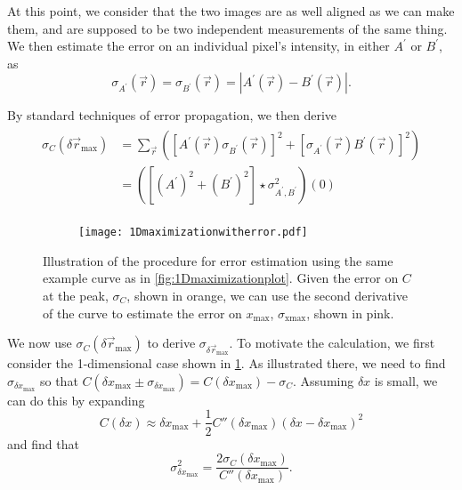 \documentclass{article}
\begin{document}
At this point, we consider that the two images are as well aligned as we can make them, and are supposed to be two independent measurements of the same thing.  We then estimate the error on an individual pixel's intensity, in either $A^\prime$ or $B^\prime$, as
\begin{equation}
\sigma_{A^\prime}(\vec{r})=\sigma_{B^\prime}(\vec{r})=\left|A^\prime(\vec{r})-B^\prime(\vec{r})\right|.
\label{eq:pixelerror}
\end{equation}

By standard techniques of error propagation, we then derive
\begin{align}
\begin{aligned}
\sigma_C(\delta\vec{r}_\text{max})&=\sum_{\vec{r}}\left(\left[A^\prime(\vec{r})\sigma_{B^\prime}(\vec{r})\right]^2+\left[\sigma_{A^\prime}(\vec{r})B^\prime(\vec{r})\right]^2\right) \\
&=([(A^\prime)^2+(B^\prime)^2]\star\sigma_{A^\prime,B^\prime}^2)(0)
\end{aligned}
\end{align}

\begin{figure}[ht]
	\centering
	\begin{subfigure}{0.45\linewidth}
		\texttt{[image: 1Dmaximizationwitherror.pdf]}
	\end{subfigure}
	\caption{Illustration of the procedure for error estimation using the same example curve as in \cref{fig:1Dmaximizationplot}.  Given the error on $C$ at the peak, $\sigma_C$, shown in orange, we can use the second derivative of the curve to estimate the error on $x_\text{max}$, $\sigma_\text{xmax}$, shown in pink.}
	\label{fig:1Dmaximizationploterror}
\end{figure}

We now use $\sigma_C(\delta\vec{r}_\text{max})$ to derive $\sigma_{\delta\vec{r}_\text{max}}$.  To motivate the calculation, we first consider the 1-dimensional case shown in \cref{fig:1Dmaximizationploterror}.  As illustrated there, we need to find $\sigma_{\delta x_\text{max}}$ so that $C(\delta x_\text{max}\pm\sigma_{\delta x_\text{max}})=C(\delta x_\text{max})-\sigma_C$.  Assuming $\delta x$ is small, we can do this by expanding
\begin{equation}
C(\delta x)\approx\delta x_\text{max} + \frac{1}{2}C''(\delta x_\text{max})(\delta x - \delta x_\text{max})^2
\end{equation}
and find that
\begin{equation}
\sigma_{\delta x_\text{max}}^2=\frac{2\sigma_C(\delta x_\text{max})}{C''(\delta x_\text{max})}.
\end{equation}
\end{document}
